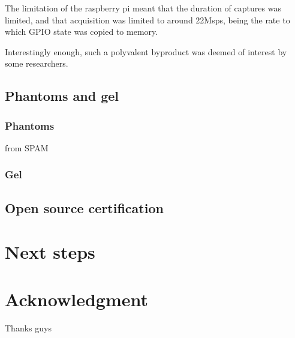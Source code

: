 \documentclass[conference]{IEEEtran}
\begin{document}
The limitation of the raspberry pi meant that the duration of captures was limited, and that acquisition was limited to around 22Msps, being the rate to which GPIO state was copied to memory. 

Interestingly enough, such a polyvalent byproduct was deemed of interest by some researchers.


\subsection{Phantoms and gel}


\subsubsection{Phantoms}

\cite{nolting_inexpensive_2016} from SPAM

\subsubsection{Gel}

\subsection{Open source certification}

\section{Next steps}



\section*{Acknowledgment}

Thanks guys





 
\end{document}

